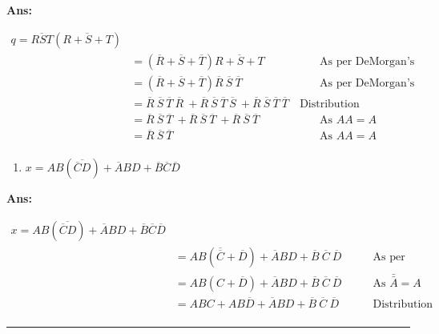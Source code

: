 \documentclass[
  a4paper,
]{article}
\providecommand{\tightlist}{%
  \setlength{\itemsep}{0pt}\setlength{\parskip}{0pt}}
\begin{document}
\textbf{Ans:}

\begin{align*}
  q = \overline{RST} (\overline{R + S + T})\\
  &= (\overline{R} + \overline{S} + \overline{T}) \overline{R + S + T}
    &\qquad \text{As per DeMorgan's Theorem}\\
  &= (\overline{R} + \overline{S} + \overline{T}) \overline{R} \ \overline{S} \ \overline{T}
    &\qquad \text{As per DeMorgan's Theorem}\\
  &= \overline{R}\  \overline{S}\  \overline{T}\  \overline{R}\  + \overline{R}\  \overline{S}\  \overline{T}\  \overline{S}\  + \overline{R}\  \overline{S}\  \overline{T}\  \overline{T}
    &\ \text{Distribution} \\
  &= \overline{R}\  \overline{S}\  \overline{T}\ + \overline{R}\  \overline{S}\  \overline{T}\ + \overline{R}\  \overline{S}\  \overline{T}
    &\qquad \text{As } AA = A \\
  &= \boxed{\overline{R}\  \overline{S}\  \overline{T}}
    &\qquad \text{As } AA = A \\
\end{align*}

\begin{enumerate}
\def\labelenumi{(\alph{enumi})}
\setcounter{enumi}{7}
\tightlist
\item
  \(x=AB(\overline{\overline{C}D})+\overline{A}BD+\overline{B}\overline{C}\overline{D}\)
\end{enumerate}

\textbf{Ans:}

\begin{align*}
  x=AB(\overline{\overline{C}D})+\overline{A}BD+\overline{B}\overline{C}\overline{D} \\
  &= AB({\overline{{\overline{{C}}}}}+{\overline{{D}}})+\overline{A}BD+\overline{B}\ \overline{C}\ \overline{D}
    &\qquad \text{As per DeMorgan's Theorem}\\
  &= AB({C}+\overline{D})+\overline{A}BD+\overline{B}\ \overline{C}\ \overline{D}
    &\qquad \text{As } \bar{\bar{A}} = A \\
  &= \boxed{ABC+AB\overline{D}+\overline{A}BD+\overline{B}\ \overline{C}\ \overline{D}}
    &\qquad \text{Distribution} \\
\end{align*}

\begin{center}\rule{0.5\linewidth}{0.5pt}\end{center}
\end{document}
